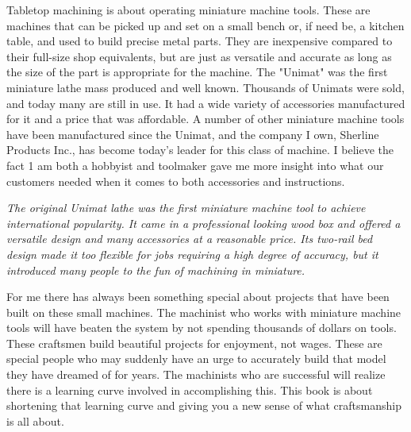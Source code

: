\secdown
\secdown


Tabletop machining is about operating miniature machine tools. These are
machines that can be picked up and set on a small bench or, if need be, a
kitchen table, and used to build precise metal parts. They are inexpensive
compared to their full-size shop equivalents, but are just as versatile and
accurate as long as the size of the part is appropriate for the machine. The
"Unimat" was the first miniature lathe mass produced and well known. Thousands
of Unimats were sold, and today many are still in use. It had a wide variety of
accessories manufactured for it and a price that was affordable. A number of
other miniature machine tools have been manufactured since the Unimat, and the
company I own, Sherline Products Inc., has become today's leader for this class
of machine. I believe the fact 1 am both a hobbyist and toolmaker gave me more
insight into what our customers needed when it comes to both accessories and
instructions.

\bigskip\noindent
\textit{The original Unimat lathe was the first miniature machine tool to 
achieve international popularity. It came in a professional looking wood box 
and offered a versatile design and many accessories at a reasonable price. Its 
two-rail bed design made it too flexible for jobs requiring a high degree of 
accuracy, but it introduced many people to the fun of machining in miniature.}
\bigskip


For me there has always been something special about projects that have been
built on these small machines. The machinist who works with miniature machine
tools will have beaten the system by not spending thousands of dollars on tools.
These craftsmen build beautiful projects for enjoyment, not wages. These are
special people who may suddenly have an urge to accurately build that model they
have dreamed of for years. The machinists who are successful will realize there
is a learning curve involved in accomplishing this. This book is about
shortening that learning curve and giving you a new sense of what craftsmanship
is all about.



